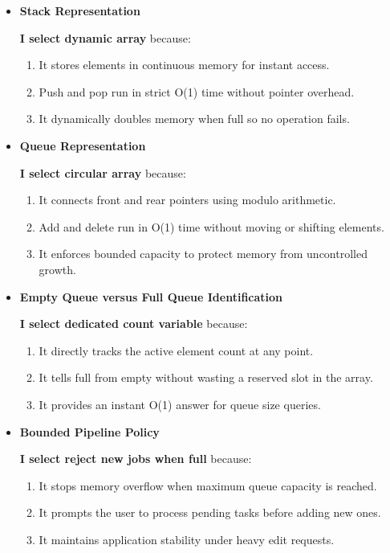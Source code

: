 \documentclass[9.5pt,a4paper]{article}
\begin{document}
\vspace{0.1cm}
\begin{itemize}[noitemsep,topsep=1pt,parsep=3pt,partopsep=0pt]
    \item \textbf{Stack Representation}
    
    \textbf{I select dynamic array} because:
    \begin{enumerate}[noitemsep,topsep=1pt,parsep=1pt]
        \item It stores elements in continuous memory for instant access.
        \item Push and pop run in strict O(1) time without pointer overhead.
        \item It dynamically doubles memory when full so no operation fails.
    \end{enumerate}

    \item \textbf{Queue Representation}
    
    \textbf{I select circular array} because:
    \begin{enumerate}[noitemsep,topsep=1pt,parsep=1pt]
        \item It connects front and rear pointers using modulo arithmetic.
        \item Add and delete run in O(1) time without moving or shifting elements.
        \item It enforces bounded capacity to protect memory from uncontrolled growth.
    \end{enumerate}

    \item \textbf{Empty Queue versus Full Queue Identification}
    
    \textbf{I select dedicated count variable} because:
    \begin{enumerate}[noitemsep,topsep=1pt,parsep=1pt]
        \item It directly tracks the active element count at any point.
        \item It tells full from empty without wasting a reserved slot in the array.
        \item It provides an instant O(1) answer for queue size queries.
    \end{enumerate}

    \item \textbf{Bounded Pipeline Policy}
    
    \textbf{I select reject new jobs when full} because:
    \begin{enumerate}[noitemsep,topsep=1pt,parsep=1pt]
        \item It stops memory overflow when maximum queue capacity is reached.
        \item It prompts the user to process pending tasks before adding new ones.
        \item It maintains application stability under heavy edit requests.
    \end{enumerate}


\end{itemize}
\end{document}
